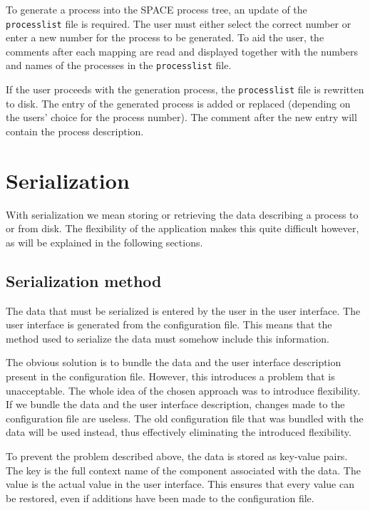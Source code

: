 To generate a process into the SPACE process tree, an update of the
\verb=processlist= file is required. The user must either select the correct
number or enter a new number for the process to be generated. To aid the user,
the comments after each mapping are read and displayed together with the
numbers and names of the processes in the \verb=processlist= file.

\bigskip \noindent
If the user proceeds with the generation process, the \verb=processlist= file
is rewritten to disk. The entry of the generated process is added or replaced
(depending on the users' choice for the process number). The comment after the
new entry will contain the process description.

\section{Serialization} \label{sect:design:serialization}
With serialization we mean storing or retrieving the data describing a process
to or from disk. The flexibility of the application makes this quite difficult
however, as will be explained in the following sections.

\subsection{Serialization method}
The data that must be serialized is entered by the user in the user interface.
The user interface is generated from the configuration file. This means that
the method used to serialize the data must somehow include this information.

The obvious solution is to bundle the data and the user interface description
present in the configuration file. However, this introduces a problem that is
unacceptable. The whole idea of the chosen approach was to introduce
flexibility. If we bundle the data and the user interface description, changes
made to the configuration file are useless. The old configuration file that was
bundled with the data will be used instead, thus effectively eliminating the
introduced flexibility.

\bigskip \noindent
To prevent the problem described above, the data is stored as key-value pairs.
The key is the full context name of the component associated with the data. The
value is the actual value in the user interface. This ensures that every value
can be restored, even if additions have been made to the configuration file.

